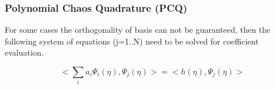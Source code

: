 \documentclass[10pt]{beamer}
\begin{document}
\begin{frame}
\frametitle{Polynomial Chaos Quadrature (PCQ)}
For some cases the orthogonality of basis can not be guaranteed, then the following system of equations (j=1..N)  need to be solved for coefficient evaluation.

\begin{equation}
    <\sum_i a_i \Psi_i (\eta), \Psi_j (\eta)>   = <h(\eta), \Psi_j (\eta) >
\end{equation}
\end{frame}
\end{document}
